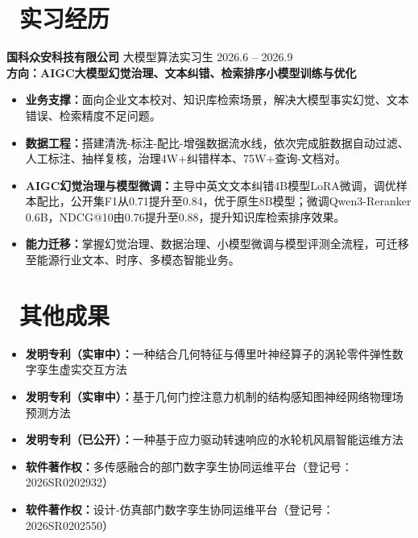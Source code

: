 \documentclass[11pt]{article}
\begin{document}
\section{\makebox[\widthof{\faBuilding}][c]{\color{CVBlue}\faBuilding}\ 实习经历}
\textbf{国科众安科技有限公司} \quad 大模型算法实习生 \hfill 2026.6 -- 2026.9\\[0.2em]
\textcolor{CVBlue}{\textbf{方向：AIGC大模型幻觉治理、文本纠错、检索排序小模型训练与优化}}
\begin{itemize}
    \item \textbf{业务支撑：}面向企业文本校对、知识库检索场景，解决大模型事实幻觉、文本错误、检索精度不足问题。
    \item \textbf{数据工程：}搭建清洗-标注-配比-增强数据流水线，依次完成脏数据自动过滤、人工标注、抽样复核，治理4W+纠错样本、75W+查询-文档对。
    \item \textbf{AIGC幻觉治理与模型微调：}主导中英文文本纠错4B模型LoRA微调，调优样本配比，公开集F1从0.71提升至0.84，优于原生8B模型；微调Qwen3-Reranker 0.6B，NDCG@10由0.76提升至0.88，提升知识库检索排序效果。
    \item \textbf{能力迁移：}掌握幻觉治理、数据治理、小模型微调与模型评测全流程，可迁移至能源行业文本、时序、多模态智能业务。
\end{itemize}



\section{\makebox[\widthof{\faTrophy}][c]{\color{CVBlue}\faTrophy}\ 其他成果}
\begin{itemize}
    \item \textbf{发明专利（实审中）：}一种结合几何特征与傅里叶神经算子的涡轮零件弹性数字孪生虚实交互方法
    \item \textbf{发明专利（实审中）：}基于几何门控注意力机制的结构感知图神经网络物理场预测方法
    \item \textbf{发明专利（已公开）：}一种基于应力驱动转速响应的水轮机风扇智能运维方法
    \item \textbf{软件著作权：}多传感融合的部门数字孪生协同运维平台（登记号：2026SR0202932）
    \item \textbf{软件著作权：}设计‑仿真部门数字孪生协同运维平台（登记号：2026SR0202550）
\end{itemize}

\end{document}
